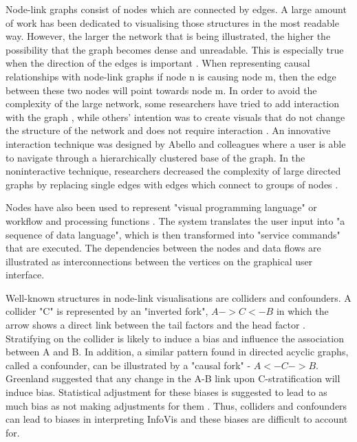 \documentclass{l4proj}
\begin{document}
Node-link graphs consist of nodes which are connected by edges. A large amount of work has been dedicated to visualising those structures in the most readable way. However, the larger the network that is being illustrated, the higher the possibility that the graph becomes dense and unreadable. This is especially true when the direction of the edges is important \cite{dwyer2013edge}. When representing causal relationships with node-link graphs if node n is causing node m, then the edge between these two nodes will point towards node m. In order to avoid the complexity of the large network, some researchers have tried to add interaction with the graph \cite{gansner2005topological}, while others' intention was to create visuals that do not change the structure of the network and does not require interaction \cite{dwyer2013edge}. An innovative interaction technique was designed by Abello and colleagues \cite{abello2006ask} where a user is able to navigate through a hierarchically clustered base of the graph. In the noninteractive technique, researchers decreased the complexity of large directed graphs by replacing single edges with edges which connect to groups of nodes \cite{dwyer2013edge}.  

Nodes have also been used to represent "visual programming language" or workflow and processing functions \cite{thattai2016systems}. The system translates the user input into "a sequence of data language", which is then transformed into "service commands" that are executed. The dependencies between the nodes and data flows are illustrated as interconnections between the vertices on the graphical user interface. 

Well-known structures in node-link visualisations are colliders and confounders. A collider "C" is represented by an "inverted fork", $A->C<-B$ in which the arrow shows a direct link between the tail factors and the head factor \cite{greenland2003quantifying}. Stratifying on the collider is likely to induce a bias and influence the association between A and B. In addition, a similar pattern found in directed acyclic graphs, called a confounder, can be illustrated by a "causal fork" - $A<-C-> B$. Greenland \cite{greenland2003quantifying} suggested that any change in the A-B link upon C-stratification will induce bias. Statistical adjustment for these biases is suggested to lead to as much bias as not making adjustments for them \cite{janszky2010janus}. Thus, colliders and confounders can lead to biases in interpreting InfoVis and these biases are difficult to account for.
\end{document}
